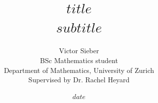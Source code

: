 \title{
$title$\\[0.5em]
\large $subtitle$
}

\author{
Victor Sieber\\[0.4em]
\small BSc Mathematics student\\
\small Department of Mathematics, University of Zurich\\[0.4em]
\small Supervised by Dr. Rachel Heyard
}

\date{$date$}